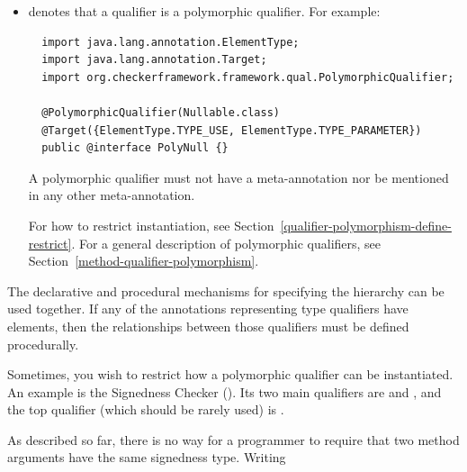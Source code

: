 \begin{itemize}
  \begin{sloppypar}
  If the top qualifier of the hierarchy is the generic unqualified type
  (this is not recommended!), then its children
  will use .  For an example, see the
  \<Encrypted> type system of Section~\ref{encrypted-example}.
  \end{sloppypar}

\item {} denotes that a qualifier is a
  polymorphic qualifier.  For example:

\begin{Verbatim}
  import java.lang.annotation.ElementType;
  import java.lang.annotation.Target;
  import org.checkerframework.framework.qual.PolymorphicQualifier;

  @PolymorphicQualifier(Nullable.class)
  @Target({ElementType.TYPE_USE, ElementType.TYPE_PARAMETER})
  public @interface PolyNull {}
\end{Verbatim}

  A polymorphic qualifier must not have
  a  meta-annotation nor be
  mentioned in any other 
  meta-annotation.

  For how to restrict instantiation, see Section~\ref{qualifier-polymorphism-define-restrict}.
  For a general description of polymorphic qualifiers, see
  Section~\ref{method-qualifier-polymorphism}.

\end{itemize}

The declarative and procedural mechanisms for specifying the hierarchy can
be used together. If any of the annotations representing type qualifiers have elements, then
the relationships between those qualifiers must be defined procedurally.



Sometimes, you wish to restrict how a polymorphic qualifier can be
instantiated.  An example is the Signedness Checker
().  Its two main qualifiers are
 and
, and the top qualifier
(which should be rarely used) is
.

As described so far, there is no way for a programmer to require that two
method arguments have the same signedness type.  Writing

